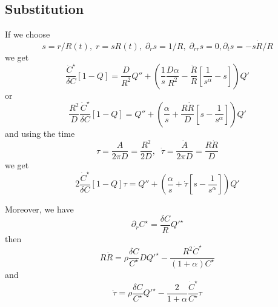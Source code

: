 \documentclass[11pt]{revtex4}
\begin{document}
\subsection{Substitution}
If we choose
\begin{equation}
	s = r/R(t),\; r = s R(t),\; \partial_r s = 1/R,\;\partial_{rr} s = 0, \partial_t s = - s \dot{R}/R
\end{equation}
we get
\begin{equation}
\dfrac{\dot{C}^\star}{\delta C} \left[1-Q\right] = \dfrac{D}{R^2} Q'' + 
\left( \dfrac{1}{s} \dfrac{D \alpha}{R^2} - \dfrac{\dot{R}}{R}\left[ \dfrac{1}{s^\alpha} - s \right]\right) Q'
\end{equation}
or
\begin{equation} 
\dfrac{R^2}{D}\dfrac{\dot{C}^\star}{\delta C} \left[1-Q\right] = Q'' + \left( \dfrac{\alpha}{s} + \dfrac{R\dot{R}}{D} \left[s-\dfrac{1}{s^\alpha}\right]\right) Q'
\end{equation}
and using the time
\begin{equation}
	\tau = \dfrac{A}{2\pi D} = \dfrac{R^2}{2D}, \;\; \dot{\tau} = \dfrac{\dot{A}}{2\pi D} = \dfrac{R\dot{R}}{D}
\end{equation}
we get
\begin{equation}
	2\dfrac{\dot{C}^\star}{\delta C} \left[1-Q\right] \tau = Q'' + \left( \dfrac{\alpha}{s} + \dot{\tau} \left[s-\dfrac{1}{s^\alpha}\right]\right) Q'
\end{equation}

Moreover, we have
\begin{equation}
	\partial_r C^\star = \dfrac{\delta C}{R} Q'^\star
\end{equation}
then
\begin{equation}
	R \dot{R} = \rho \dfrac{\delta C}{C^\star} D Q'^\star - \dfrac{R^2\dot{C}^\star}{\left(1+\alpha\right)C^\star}
\end{equation}
and
\begin{equation}
\dot{\tau} = \rho \dfrac{\delta C}{C^\star} Q'^\star - \dfrac{2}{1+\alpha} \dfrac{\dot{C}^\star}{C^\star} \tau
\end{equation}
\end{document}
